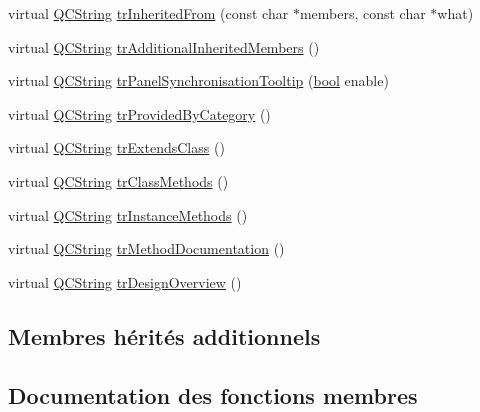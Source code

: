 \begin{DoxyCompactItemize}
\item 
virtual \hyperlink{class_q_c_string}{Q\+C\+String} \hyperlink{class_translator_german_af3678ca0b6cf674a45bd666bbce9d344}{tr\+Inherited\+From} (const char $\ast$members, const char $\ast$what)
\item 
virtual \hyperlink{class_q_c_string}{Q\+C\+String} \hyperlink{class_translator_german_a289ea8b81cae78f0584ddf5a716522ec}{tr\+Additional\+Inherited\+Members} ()
\item 
virtual \hyperlink{class_q_c_string}{Q\+C\+String} \hyperlink{class_translator_german_af2a278ea9f46f9e140f0e6f26180eff5}{tr\+Panel\+Synchronisation\+Tooltip} (\hyperlink{qglobal_8h_a1062901a7428fdd9c7f180f5e01ea056}{bool} enable)
\item 
virtual \hyperlink{class_q_c_string}{Q\+C\+String} \hyperlink{class_translator_german_a3b0f0724e19d5adca9edd52fff79f341}{tr\+Provided\+By\+Category} ()
\item 
virtual \hyperlink{class_q_c_string}{Q\+C\+String} \hyperlink{class_translator_german_a6c9ec7a1d0ca7960b780aec8776c7783}{tr\+Extends\+Class} ()
\item 
virtual \hyperlink{class_q_c_string}{Q\+C\+String} \hyperlink{class_translator_german_af5ee36dafc3d3c45e894a8b6dbab9011}{tr\+Class\+Methods} ()
\item 
virtual \hyperlink{class_q_c_string}{Q\+C\+String} \hyperlink{class_translator_german_a2eb5ae984194c1abae2b5c81aa8f2f7e}{tr\+Instance\+Methods} ()
\item 
virtual \hyperlink{class_q_c_string}{Q\+C\+String} \hyperlink{class_translator_german_a34d26545a7d053cefeb7dbb60ec6282d}{tr\+Method\+Documentation} ()
\item 
virtual \hyperlink{class_q_c_string}{Q\+C\+String} \hyperlink{class_translator_german_aabb0798fc4f61a997152d4d9ff943991}{tr\+Design\+Overview} ()
\end{DoxyCompactItemize}
\subsection*{Membres hérités additionnels}


\subsection{Documentation des fonctions membres}
\hypertarget{class_translator_german_a82f8ab5c8c82b00409b6afad3b515f2b}{}
